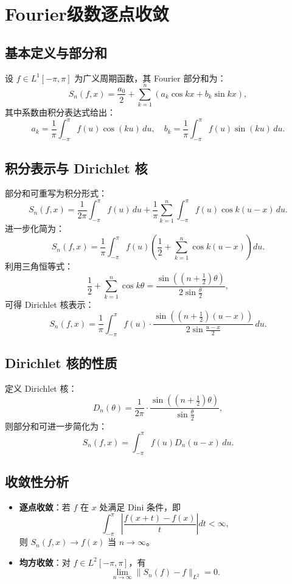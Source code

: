 \documentclass[12pt]{article}
\begin{document}
	\section{Fourier级数逐点收敛}
	
	\subsection{基本定义与部分和}
	设 \( f \in L^1[-\pi, \pi] \) 为广义周期函数，其 Fourier 部分和为：
	\[
	S_n(f, x) = \frac{a_0}{2} + \sum_{k=1}^n \left( a_k \cos kx + b_k \sin kx \right),
	\]
	其中系数由积分表达式给出：
	\[
	a_k = \frac{1}{\pi} \int_{-\pi}^{\pi} f(u) \cos(ku) \, du, \quad 
	b_k = \frac{1}{\pi} \int_{-\pi}^{\pi} f(u) \sin(ku) \, du.
	\]
	
	\subsection{积分表示与 Dirichlet 核}
	部分和可重写为积分形式：
	\[
	S_n(f, x) = \frac{1}{2\pi} \int_{-\pi}^{\pi} f(u) \, du + \frac{1}{\pi} \sum_{k=1}^n \int_{-\pi}^{\pi} f(u) \cos k(u-x) \, du.
	\]
	进一步化简为：
	\[
	S_n(f, x) = \frac{1}{\pi} \int_{-\pi}^{\pi} f(u) \left( \frac{1}{2} + \sum_{k=1}^n \cos k(u-x) \right) du.
	\]
	利用三角恒等式：
	\[
	\frac{1}{2} + \sum_{k=1}^n \cos k\theta = \frac{\sin\left( (n+\frac{1}{2})\theta \right)}{2 \sin \frac{\theta}{2}},
	\]
	可得 Dirichlet 核表示：
	\[
	S_n(f, x) = \frac{1}{\pi} \int_{-\pi}^{\pi} f(u) \cdot \frac{\sin\left( (n+\frac{1}{2})(u-x) \right)}{2 \sin \frac{u-x}{2}} \, du.
	\]
	
	\subsection{Dirichlet 核的性质}
	定义 Dirichlet 核：
	\[
	D_n(\theta) = \frac{1}{2\pi} \cdot \frac{\sin\left( (n+\frac{1}{2})\theta \right)}{\sin \frac{\theta}{2}},
	\]
	则部分和可进一步简化为：
	\[
	S_n(f, x) = \int_{-\pi}^{\pi} f(u) D_n(u-x) \, du.
	\]
	
	\subsection{收敛性分析}
	\begin{itemize}
		\item \textbf{逐点收敛}：若 \( f \) 在 \( x \) 处满足 Dini 条件，即
		\[
		\int_{-\pi}^{\pi} \left| \frac{f(x+t) - f(x)}{t} \right| dt < \infty,
		\]
		则 \( S_n(f, x) \to f(x) \) 当 \( n \to \infty \)。
		
		\item \textbf{均方收敛}：对 \( f \in L^2[-\pi, \pi] \)，有
		\[
		\lim_{n \to \infty} \| S_n(f) - f \|_{L^2} = 0.
		\]
	\end{itemize}
	
\end{document}
